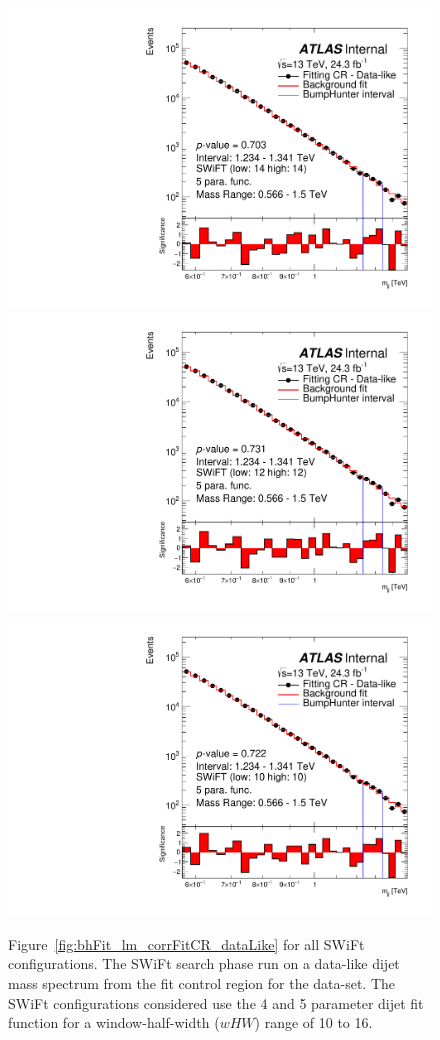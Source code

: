 \begin{figure}[!htb]
{}
 {
  \includegraphics[width=0.35\linewidth, angle=0]{figs/Dibjet/LowMass/FitStudy_min566/bhFit_corrFitCR_dataLike_v13_5para_low14_high14.pdf}
}
 {
  \includegraphics[width=0.35\linewidth, angle=0]{figs/Dibjet/LowMass/FitStudy_min566/bhFit_corrFitCR_dataLike_v13_5para_low12_high12.pdf}
}
 {
  \includegraphics[width=0.35\linewidth, angle=0]{figs/Dibjet/LowMass/FitStudy_min566/bhFit_corrFitCR_dataLike_v13_5para_low10_high10.pdf}
}
\vspace{10pt}
\caption[Figure~\ref{fig:bhFit_lm_corrFitCR_dataLike} for all SWiFt configurations.]
{\label{fig:app-bhFit_lm_corrFitCR_dataLike}
  Figure~\ref{fig:bhFit_lm_corrFitCR_dataLike} for all SWiFt configurations.
  The SWiFt search phase run on a data-like dijet mass spectrum
  from the fit control region for the \lm{} data-set.
  The SWiFt configurations considered use the 4 and 5 parameter dijet fit function for a window-half-width ($wHW$) range of 10 to 16.
}
\end{figure}


